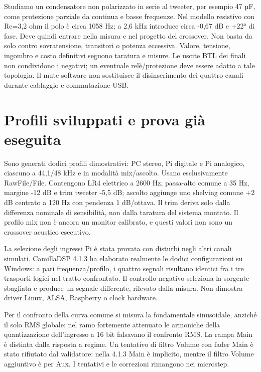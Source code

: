 \documentclass[
  italian,
  11pt,
  a4paper,
]{article}
\begin{document}
Studiamo un condensatore non polarizzato in serie al tweeter, per esempio 47 µF, come
protezione parziale da continua e basse frequenze. Nel modello resistivo con Re=3,2 ohm il
polo è circa 1058 Hz; a 2,6 kHz introduce circa -0,67 dB e +22° di fase. Deve quindi entrare
nella misura e nel progetto del crossover. Non basta da solo contro sovratensione,
transitori o potenza eccessiva. Valore, tensione, ingombro e costo definitivi seguono
taratura e misure. Le uscite BTL dei finali non condividono i negativi; un eventuale
relè/protezione deve essere adatto a tale topologia. Il mute software non sostituisce il
disinserimento dei quattro canali durante cablaggio e commutazione USB.

\section{Profili sviluppati e prova già
eseguita}\label{profili-sviluppati-e-prova-giuxe0-eseguita}

Sono generati dodici profili dimostrativi: PC stereo, Pi digitale e Pi analogico, ciascuno a
44,1/48 kHz e in modalità mix/ascolto. Usano esclusivamente RawFile/File. Contengono LR4
elettrico a 2600 Hz, passa-alto comune a 35 Hz, margine -12 dB e trim tweeter -5,5 dB;
ascolto aggiunge uno shelving comune +2 dB centrato a 120 Hz con pendenza 1 dB/ottava. Il
trim deriva solo dalla differenza nominale di sensibilità, non dalla taratura del sistema
montato. Il profilo mix non è ancora un monitor calibrato, e questi valori non sono un
crossover acustico esecutivo.

La selezione degli ingressi Pi è stata provata con disturbi negli altri canali simulati.
CamillaDSP 4.1.3 ha elaborato realmente le dodici configurazioni su Windows: a pari
frequenza/profilo, i quattro segnali risultano identici fra i tre trasporti logici nel
tratto confrontato. Il controllo negativo seleziona la sorgente sbagliata e produce un
segnale differente, rilevato dalla misura. Non dimostra driver Linux, ALSA, Raspberry o
clock hardware.

Per il confronto della curva comune si misura la fondamentale sinusoidale, anziché il solo
RMS globale: nel ramo fortemente attenuato le armoniche della quantizzazione dell'ingresso a
16 bit falsavano il confronto RMS. La rampa Main è distinta dalla risposta a regime. Un
tentativo di filtro Volume con fader Main è stato rifiutato dal validatore: nella 4.1.3 Main
è implicito, mentre il filtro Volume aggiuntivo è per Aux. I tentativi e le correzioni
rimangono nei microstep.
\end{document}
